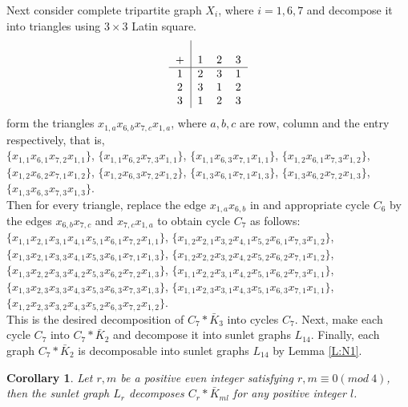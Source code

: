 \documentclass[12pt]{report}
\newtheorem{cor}[thm]{Corollary}
\begin{document}
Next consider complete tripartite graph $X_i$, where $i=1,6,7$ and
decompose it into triangles using $3\times 3$ Latin square.\\
$$\begin{tabular}{c|ccc}\\
+ & 1& 2 & 3\\
\hline
1 & 2 & 3 & 1\\
2 & 3 & 1 & 2\\
3 & 1 & 2 & 3\\
\end{tabular}$$
form the triangles $x_{1,a}x_{6,b}x_{7,c}x_{1,a}$, where $a,b,c$ are
row,
column and the entry respectively, that is,\\
$\{x_{1,1}x_{6,1}x_{7,2}x_{1,1}\}$,
$\{x_{1,1}x_{6,2}x_{7,3}x_{1,1}\}$,
$\{x_{1,1}x_{6,3}x_{7,1}x_{1,1}\}$,
$\{x_{1,2}x_{6,1}x_{7,3}x_{1,2}\}$,\\
$\{x_{1,2}x_{6,2}x_{7,1}x_{1,2}\}$,
$\{x_{1,2}x_{6,3}x_{7,2}x_{1,2}\}$,
$\{x_{1,3}x_{6,1}x_{7,1}x_{1,3}\}$,
$\{x_{1,3}x_{6,2}x_{7,2}x_{1,3}\}$,
$\{x_{1,3}x_{6,3}x_{7,3}x_{1,3}\}$.\\
 Then for every triangle, replace the edge $x_{1,a}x_{6,b}$ in and
 appropriate cycle $C_6$ by the edges $x_{6,b}x_{7,c}$ and
 $x_{7,c}x_{1,a}$ to obtain cycle $C_7$ as follows:\\
$\{x_{1,1}x_{2,1}x_{3,1}x_{4,1}x_{5,1}x_{6,1}x_{7,2}x_{1,1}\}$,
$\{x_{1,2}x_{2,1}x_{3,2}x_{4,1}x_{5,2}x_{6,1}x_{7,3}x_{1,2}\}$,\\
$\{x_{1,3}x_{2,1}x_{3,3}x_{4,1}x_{5,3}x_{6,1}x_{7,1}x_{1,3}\}$,
$\{x_{1,2}x_{2,2}x_{3,2}x_{4,2}x_{5,2}x_{6,2}x_{7,1}x_{1,2}\}$,\\
$\{x_{1,3}x_{2,2}x_{3,3}x_{4,2}x_{5,3}x_{6,2}x_{7,2}x_{1,3}\}$,
$\{x_{1,1}x_{2,2}x_{3,1}x_{4,2}x_{5,1}x_{6,2}x_{7,3}x_{1,1}\}$,\\
$\{x_{1,3}x_{2,3}x_{3,3}x_{4,3}x_{5,3}x_{6,3}x_{7,3}x_{1,3}\}$,
$\{x_{1,1}x_{2,3}x_{3,1}x_{4,3}x_{5,1}x_{6,3}x_{7,1}x_{1,1}\}$,\\
$\{x_{1,2}x_{2,3}x_{3,2}x_{4,3}x_{5,2}x_{6,3}x_{7,2}x_{1,2}\}$.\\
This is the desired decomposition of $C_7*\bar{K}_3$ into cycles
$C_7$. Next, make each cycle $C_7$ into $C_7*\bar{K}_2$ and
decompose it into sunlet graphs $L_{14}$. Finally, each graph
$C_7*\bar{K}_2$ is decomposable into sunlet graphs $L_{14}$ by Lemma
\ref{L:N1}.
\begin{cor}\label{C:R}
Let $r,m$ be a positive even integer satisfying $r,m\equiv 0(mod\
4)$, then the sunlet graph $L_r$ decomposes $C_r*\bar{K}_{ml}$ for
any positive integer $l$.
\end{cor}
\end{document}
